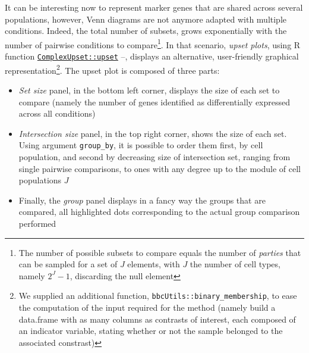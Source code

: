 \begin{Shaded}
\begin{Highlighting}[]
\OtherTok{\textless{}{-}}\SpecialCharTok{::}\NormalTok{(}
   \NormalTok{)}
\end{Highlighting}
\end{Shaded}

It can be interesting now to represent marker genes that are shared across several populations, however, Venn diagrams are not anymore adapted with multiple conditions. Indeed, the total number of subsets, grows exponentially with the number of pairwise conditions to compare\footnote{The number of possible subsets to compare equals the number of \emph{parties} that can be sampled for a set of \(J\) elements, with \(J\) the number of cell types, namely \(2^J -1\), discarding the null element}. In that scenario, \emph{upset plots}, using R function \href{https://krassowski.github.io/complex-upset/reference/upset.html}{\texttt{ComplexUpset::upset}} \autocite{R-ComplexUpset}--\autocite{ComplexUpset2020}, displays an alternative, user-friendly graphical representation\footnote{We supplied an additional function, \texttt{bbcUtils::binary\_membership}, to ease the computation of the input required for the method (namely build a data.frame with as many columns as contrasts of interest, each composed of an indicator variable, stating whether or not the sample belonged to the associated constrast)}. The upset plot is composed of three parts:

\begin{itemize}
\item
  \emph{Set size} panel, in the bottom left corner, displays the size of each set to compare (namely the number of genes identified as differentially expressed across all conditions)
\item
  \emph{Intersection size} panel, in the top right corner, shows the size of each set. Using argument \texttt{group\_by}, it is possible to order them first, by cell population, and second by decreasing size of intersection set, ranging from single pairwise comparisons, to ones with any degree up to the module of cell populations \(J\)
\item
  Finally, the \emph{group} panel displays in a fancy way the groups that are compared, all highlighted dots corresponding to the actual group comparison performed
\end{itemize}

